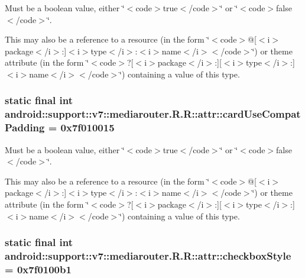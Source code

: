 Must be a boolean value, either \char`\"{}$<$code$>$true$<$/code$>$\char`\"{} or \char`\"{}$<$code$>$false$<$/code$>$\char`\"{}. 

This may also be a reference to a resource (in the form \char`\"{}$<$code$>$@\mbox{[}$<$i$>$package$<$/i$>$:\mbox{]}$<$i$>$type$<$/i$>$:$<$i$>$name$<$/i$>$$<$/code$>$\char`\"{}) or theme attribute (in the form \char`\"{}$<$code$>$?\mbox{[}$<$i$>$package$<$/i$>$:\mbox{]}\mbox{[}$<$i$>$type$<$/i$>$:\mbox{]}$<$i$>$name$<$/i$>$$<$/code$>$\char`\"{}) containing a value of this type. \hypertarget{classandroid_1_1support_1_1v7_1_1mediarouter_1_1_r_1_1attr_946f4eb839af56d1c68cff71209d1e16}{
\subsubsection[{cardUseCompatPadding}]{\setlength{\rightskip}{0pt plus 5cm}static final int android::support::v7::mediarouter.R.R::attr::cardUseCompatPadding = 0x7f010015}}
\label{classandroid_1_1support_1_1v7_1_1mediarouter_1_1_r_1_1attr_946f4eb839af56d1c68cff71209d1e16}


Must be a boolean value, either \char`\"{}$<$code$>$true$<$/code$>$\char`\"{} or \char`\"{}$<$code$>$false$<$/code$>$\char`\"{}. 

This may also be a reference to a resource (in the form \char`\"{}$<$code$>$@\mbox{[}$<$i$>$package$<$/i$>$:\mbox{]}$<$i$>$type$<$/i$>$:$<$i$>$name$<$/i$>$$<$/code$>$\char`\"{}) or theme attribute (in the form \char`\"{}$<$code$>$?\mbox{[}$<$i$>$package$<$/i$>$:\mbox{]}\mbox{[}$<$i$>$type$<$/i$>$:\mbox{]}$<$i$>$name$<$/i$>$$<$/code$>$\char`\"{}) containing a value of this type. \hypertarget{classandroid_1_1support_1_1v7_1_1mediarouter_1_1_r_1_1attr_bfcf0b168171c1dfef67e8ba591853dc}{
\subsubsection[{checkboxStyle}]{\setlength{\rightskip}{0pt plus 5cm}static final int android::support::v7::mediarouter.R.R::attr::checkboxStyle = 0x7f0100b1}}
\label{classandroid_1_1support_1_1v7_1_1mediarouter_1_1_r_1_1attr_bfcf0b168171c1dfef67e8ba591853dc}


